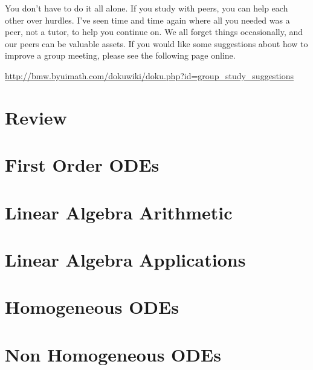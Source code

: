 \documentclass[letterpaper,oneside]{book}%
\theoremstyle{plain}
\theoremstyle{box}
\theoremstyle{problem}
\begin{document}
You don't have to do it all alone.  If you study with peers, you can help each other over hurdles. I've seen time and time again where all you needed was a peer, not a tutor, to help you continue on.  We all forget things occasionally, and our peers can be valuable assets.  If you would like some suggestions about how to improve a group meeting, please see the following page online.
\begin{center}
 \href{http://bmw.byuimath.com/dokuwiki/doku.php?id=group\_study\_suggestions}{http://bmw.byuimath.com/dokuwiki/doku.php?id=group\_study\_suggestions}
\end{center}
\mainmatter

\newcommand{\mysubsection}[1]{\subsection*{#1}\addcontentsline{toc}{subsection}{#1}}
\chapter{Review}



\chapter{First Order ODEs}



\chapter{Linear Algebra Arithmetic}





\chapter{Linear Algebra Applications}






\chapter{Homogeneous ODEs}




\chapter{Non Homogeneous ODEs}


\end{document}
